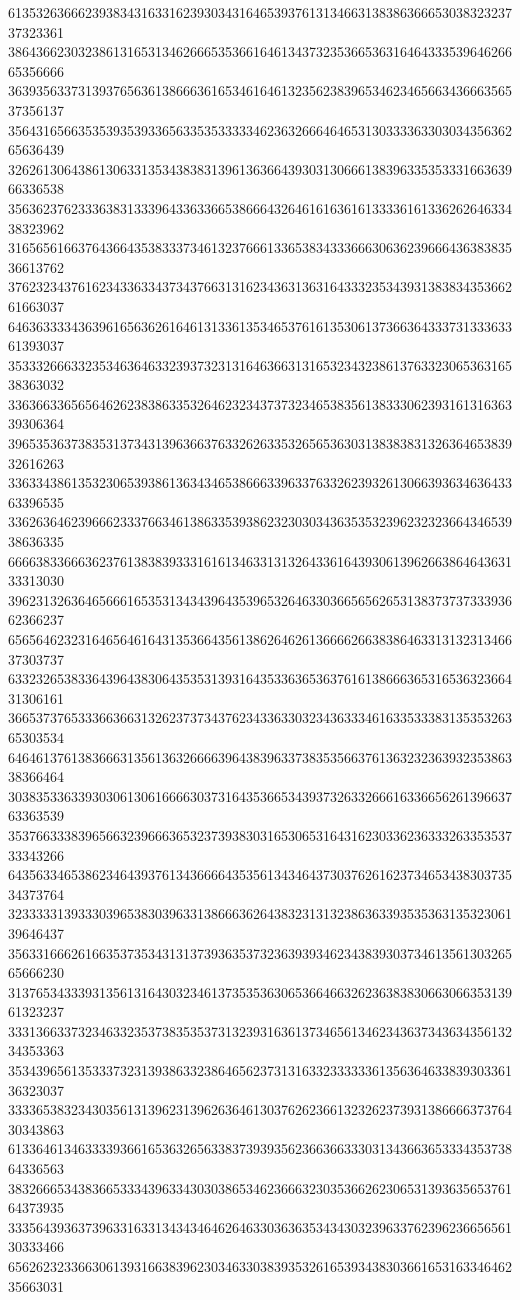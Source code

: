 61353263666239383431633162393034316465393761313466313838636665303832323737323361
38643662303238613165313462666535366164613437323536653631646433353964626665356666
36393563373139376563613866636165346164613235623839653462346566343666356537356137
35643165663535393539336563353533333462363266646465313033336330303435636265636439
32626130643861306331353438383139613636643930313066613839633535333166363966336538
35636237623336383133396433633665386664326461616361613333616133626264633438323962
31656561663764366435383337346132376661336538343336663063623966643638383536613762
37623234376162343363343734376631316234363136316433323534393138383435366261663037
64636333343639616563626164613133613534653761613530613736636433373133363361393037
35333266633235346364633239373231316463663131653234323861376332306536316538363032
33636633656564626238386335326462323437373234653835613833306239316131636339306364
39653536373835313734313963663763326263353265653630313838383132636465383932616263
33633438613532306539386136343465386663396337633262393261306639363463643363396535
33626364623966623337663461386335393862323030343635353239623232366434653938636335
66663833666362376138383933316161346331313264336164393061396266386464363133313030
39623132636465666165353134343964353965326463303665656265313837373733393662366237
65656462323164656461643135366435613862646261366662663838646331313231346637303737
63323265383364396438306435353139316435336365363761613866636531653632366431306161
36653737653336636631326237373437623433633032343633346163353338313535326365303534
64646137613836663135613632666639643839633738353566376136323236393235386338366464
30383533633930306130616666303731643536653439373263326661633665626139663763363539
35376633383965663239666365323739383031653065316431623033623633326335353733343266
64356334653862346439376134366664353561343464373037626162373465343830373534373764
32333331393330396538303963313866636264383231313238636339353536313532306139646437
35633166626166353735343131373936353732363939346234383930373461356130326565666230
31376534333931356131643032346137353536306536646632623638383066306635313961323237
33313663373234633235373835353731323931636137346561346234363734363435613234353363
35343965613533373231393863323864656237313163323333336135636463383930336136323037
33336538323430356131396231396263646130376262366132326237393138666637376430343863
61336461346333393661653632656338373939356236636633303134366365333435373864336563
38326665343836653334396334303038653462366632303536626230653139363565376164373935
33356439363739633163313434346462646330363635343430323963376239623665656130333466
65626232336630613931663839623034633038393532616539343830366165316334646235663031
